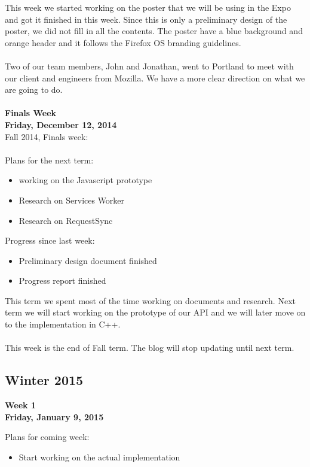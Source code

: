 \noindent This week we started working on the poster that we will be using in the Expo and got it finished in this week. Since this is only a preliminary design of the poster, we did not fill in all the contents. The poster have a blue background and orange header and it follows the Firefox OS branding guidelines.
\\\\
Two of our team members, John and Jonathan, went to Portland to meet with our client and engineers from Mozilla. We have a more clear direction on what we are going to do. \\
\\
\textbf{Finals Week\\Friday, December 12, 2014\\}
Fall 2014, Finals week: \\
\\
\noindent Plans for the next term:
\begin{itemize}
\item working on the Javascript prototype
\item Research on Services Worker
\item Research on RequestSync
\end{itemize}

\noindent Progress since last week:
\begin{itemize}
\item Preliminary design document finished
\item Progress report finished
\end{itemize}

\noindent This term we spent most of the time working on documents and research. Next term we will start working on the prototype of our API and we will later move on to the implementation in C++.
\\\\
This week is the end of Fall term. The blog will stop updating until next term.

\subsection{Winter 2015}
\textbf{Week 1\\Friday, January 9, 2015\\}

\noindent Plans for coming week:
\begin{itemize}
\item Start working on the actual implementation
\end{itemize}

